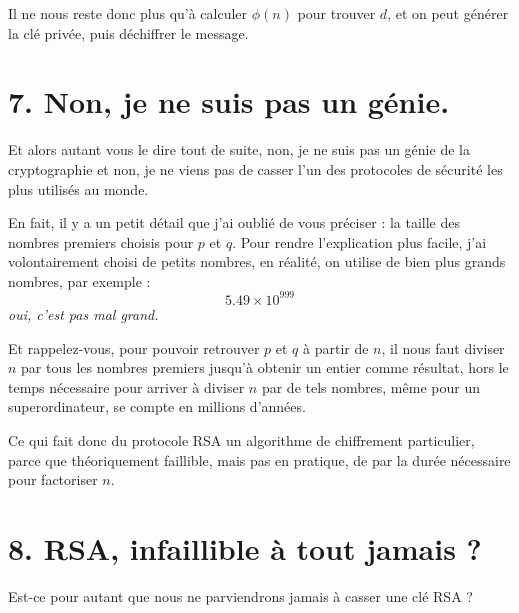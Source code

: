 \documentclass[
  paper=a4,
  ,captions=tableheading
]{scrartcl}
\begin{document}
Il ne nous reste donc plus qu'à calculer \(\phi(n)\) pour trouver \(d\),
et on peut générer la clé privée, puis déchiffrer le message.

\section{7. Non, je ne suis pas un
génie.}\label{non-je-ne-suis-pas-un-guxe9nie.}

Et alors autant vous le dire tout de suite, non, je ne suis pas un génie
de la cryptographie et non, je ne viens pas de casser l'un des
protocoles de sécurité les plus utilisés au monde.

En fait, il y a un petit détail que j'ai oublié de vous préciser : la
taille des nombres premiers choisis pour \(p\) et \(q\). Pour rendre
l'explication plus facile, j'ai volontairement choisi de petits nombres,
en réalité, on utilise de bien plus grands nombres, par exemple : \[
5.49 \times 10^{999}
\] \emph{oui, c'est pas mal grand.}

Et rappelez-vous, pour pouvoir retrouver \(p\) et \(q\) à partir de
\(n\), il nous faut diviser \(n\) par tous les nombres premiers jusqu'à
obtenir un entier comme résultat, hors le temps nécessaire pour arriver
à diviser \(n\) par de tels nombres, même pour un superordinateur, se
compte en millions d'années.

Ce qui fait donc du protocole RSA un algorithme de chiffrement
particulier, parce que théoriquement faillible, mais pas en pratique, de
par la durée nécessaire pour factoriser \(n\).

\section{8. RSA, infaillible à tout jamais
?}\label{rsa-infaillible-uxe0-tout-jamais}

Est-ce pour autant que nous ne parviendrons jamais à casser une clé RSA
?
\end{document}
